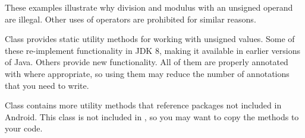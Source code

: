 These examples illustrate why division and modulus with an unsigned operand
are illegal.  Other uses of operators are prohibited for similar reasons.



Class  provides static
utility methods for working with unsigned values.  Some of these
re-implement functionality in JDK 8, making it available in earlier
versions of Java.  Others provide new functionality.  All of them are
properly annotated with 
where appropriate, so using them may reduce the number of annotations that
you need to write.

Class  contains more utility
methods that reference packages not included in Android.  This class is not
included in , so you may want to copy the methods to your code.
